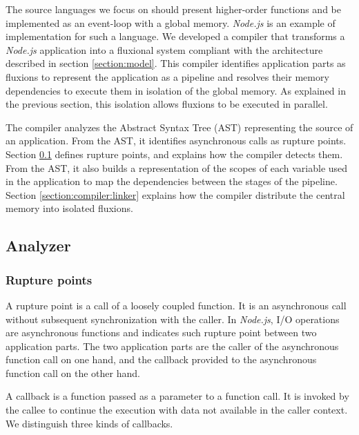 The source languages we focus on should present higher-order functions and be implemented as an event-loop with a global memory.
\textit{Node.js} is an example of implementation for such a language.
We developed a compiler that transforms a \textit{Node.js} application into a fluxional system compliant with the architecture described in section \ref{section:model}.
This compiler identifies application parts as fluxions to represent the application as a pipeline and resolves their memory dependencies to execute them in isolation of the global memory.
As explained in the previous section, this isolation allows fluxions to be executed in parallel.

The compiler analyzes the Abstract Syntax Tree (AST) representing the source of an application.
From the AST, it identifies asynchronous calls as rupture points.
Section \ref{section:compiler:analyzer} defines rupture points, and explains how the compiler detects them.
From the AST, it also builds a representation of the scopes of each variable used in the application to map the dependencies between the stages of the pipeline.
Section \ref{section:compiler:linker} explains how the compiler distribute the central memory into isolated fluxions.


\subsection{Analyzer} \label{section:compiler:analyzer}

\subsubsection{Rupture points} \label{section:compiler:analyzer:rupture}

A rupture point is a call of a loosely coupled function.
It is an asynchronous call without subsequent synchronization with the caller.
In \textit{Node.js}, I/O operations are asynchronous functions and indicates such rupture point between two application parts.
The two application parts are the caller of the asynchronous function call on one hand, and the callback provided to the asynchronous function call on the other hand.

A callback is a function passed as a parameter to a function call.
It is invoked by the callee to continue the execution with data not available in the caller context.
We distinguish three kinds of callbacks.

